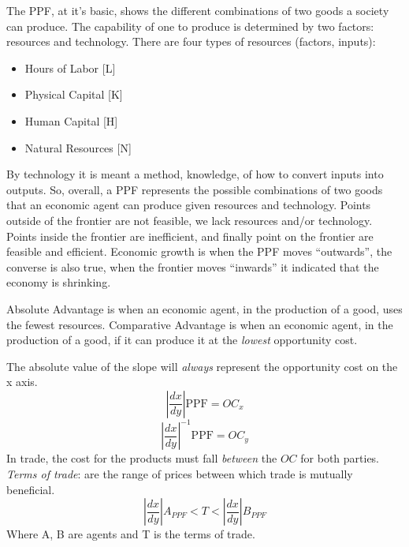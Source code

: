 \documentclass{article}
\begin{document}
\begin{spacing}{1.2}
	\newpage
	The PPF, at it's basic, shows the different
	combinations of two goods a society can produce. The capability
	of one to produce is determined by two factors: resources and
	technology. There are four types of resources (factors, inputs):
	\begin{itemize}
		\item Hours of Labor [L]
		\item Physical Capital [K]
		\item Human Capital [H]
		\item Natural Resources [N]
	\end{itemize}
	By technology it is meant a method, knowledge, of how to convert
	inputs into outputs. So, overall, a PPF represents the possible
	combinations of two goods that an economic agent can produce given
  resources and technology. Points outside of the frontier are not feasible, we
  lack resources and/or technology. Points inside the frontier are inefficient,
  and finally point on the frontier are feasible and efficient. 
  Economic growth is when the PPF moves ``outwards'', the converse is also true,
  when the frontier moves ``inwards'' it indicated that the economy is 
  shrinking. 

  Absolute Advantage is when an economic agent, in the production of a good, 
  uses the fewest resources.
  Comparative Advantage is when an economic agent, in the production of a good,
  if it can produce it at the \emph{lowest} opportunity cost.

  The absolute value of the slope will \emph{always} represent the opportunity
  cost on the x axis.
  \begin{equation}
    |\frac{dx}{dy}| \text{PPF} = OC_x
  \end{equation}
  \begin{equation}
    |\frac{dx}{dy}|^{-1} \text{PPF} = OC_y
  \end{equation}
  In trade, the cost for the products must fall \emph{between} the \(OC\) for
  both parties. \emph{Terms of trade}: are the range of prices between which
  trade is mutually beneficial. 
  \begin{equation}
    |\frac{dx}{dy}| A_{PPF} < T < |\frac{dx}{dy}| B_{PPF}
  \end{equation}
  Where A, B are agents and T is the terms of trade.
\end{spacing}
\end{document}
